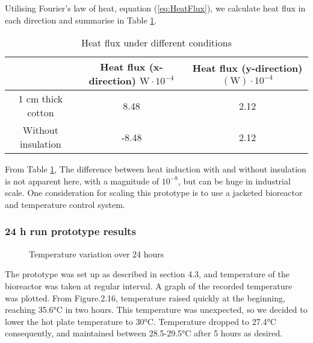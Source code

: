 Utilising Fourier's law of heat, equation (\ref{eq:HeatFlux}), we calculate heat flux in each direction and summarise in Table \ref{tb:HeatFlux}.

\begin{table}[h!]
    \begin{tabular}{c c c}
        \toprule
         & Heat flux (x-direction) $\si{\watt} \cdot 10^{-4}$ & Heat flux (y-direction) $(\si{\watt}) \cdot 10^{-4}$ \\
        \midrule
        1 cm thick cotton	&	8.48	&	2.12	\\
        Without insulation	&	-8.48	&	2.12	\\
        \bottomrule
    \end{tabular}
    \caption{Heat flux under different conditions}
    \label{tb:HeatFlux}
\end{table}

From Table \ref{tb:HeatFlux}, The difference between heat induction with and without insulation is not apparent here, with a magnitude of $10^{-8}$, but can be huge in industrial scale. One consideration for scaling this prototype is to use a jacketed bioreactor and temperature control system.  

\subsubsection{24 h run prototype results}
\begin{figure}[h!]
    \centering
    \caption{Temperature variation over 24 hours}
\end{figure}

The prototype was set up as described in section 4.3, and temperature of the bioreactor was taken at regular interval. A graph of the recorded temperature was plotted. From Figure.2.16, temperature raised quickly at the beginning, reaching 35.6\si{\celsius} in two hours. This temperature was unexpected, so we decided to lower the hot plate temperature to 30\si{\celsius}. Temperature dropped to 27.4\si{\celsius} consequently, and maintained between 28.5-29.5\si{\celsius} after 5 hours as desired.  

